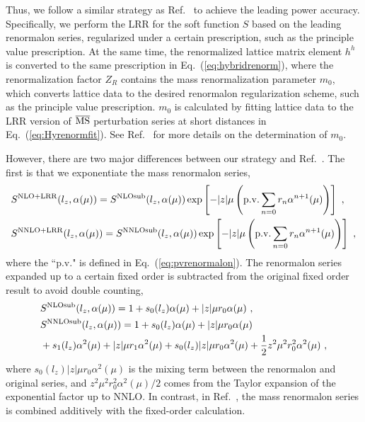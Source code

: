 \documentclass[a4paper,11pt]{article}
\begin{document}
Thus, we follow a similar strategy as Ref.~\cite{Zhang:2023bxs} to achieve the leading power accuracy. Specifically, we perform the LRR for the soft function $S$ based on the leading renormalon series, regularized under a certain prescription, such as the principle value prescription. At the same time, the renormalized lattice matrix element $h^h$ is converted to the same prescription in Eq.~(\ref{eq:hybridrenorm}), where the renormalization factor $Z_R$ contains the mass renormalization parameter $m_0$, which converts lattice data to the desired renormalon regularization scheme, such as the principle value prescription. $m_0$ is calculated by fitting lattice data to the LRR version of $\overline{\rm MS}$ perturbation series at short distances in Eq.~(\ref{eq:Hyrenormfit}). See Ref.~\cite{Zhang:2023bxs} for more details on the determination of $m_0$.

However, there are two major differences between our strategy and Ref.~\cite{Zhang:2023bxs}. The first is that we exponentiate the mass renormalon series,
\begin{align}\label{eq:SLRR}
&S^{\rm NLO+LRR}(l_z,\alpha(\mu)) = S^{\rm NLOsub}(l_z,\alpha(\mu)) \exp\left[-|z|\mu \left({\rm p.v.}\sum_{n=0} r_{n} \alpha^{n+1}(\mu)\right) \right] \ , \nonumber\\
&S^{\rm NNLO+LRR}(l_z,\alpha(\mu)) = S^{\rm NNLOsub}(l_z,\alpha(\mu))\exp\left[-|z|\mu \left({\rm p.v.}\sum_{n=0} r_{n} \alpha^{n+1}(\mu)\right) \right] \ ,
\end{align}
where the ``p.v." is defined in Eq.~(\ref{eq:pvrenormalon}). The renormalon series expanded up to a certain fixed order is subtracted from the original fixed order result to avoid double counting,
\begin{align}\label{eq:Ssub}
&S^{\rm NLOsub}(l_z,\alpha(\mu)) = 1 + s_0(l_z) \alpha(\mu) + |z|\mu r_0 \alpha(\mu) \ , \nonumber\\
&S^{\rm NNLOsub}(l_z,\alpha(\mu)) = 1 + s_0(l_z) \alpha(\mu) + |z|\mu r_0 \alpha(\mu) \nonumber\\
& + s_1(l_z) \alpha^2(\mu) + |z|\mu r_1 \alpha^2(\mu)
+ s_0(l_z) |z|\mu r_0 \alpha^2(\mu) + \frac{1}{2} z^2 \mu^2 r_0^2 \alpha^2(\mu) \ ,
\end{align}
where $s_0(l_z) |z|\mu r_0 \alpha^2(\mu)$ is the mixing term between the renormalon and original series, and $z^2 \mu^2 r_0^2 \alpha^2(\mu)/2$ comes from the Taylor expansion of the exponential factor up to NNLO. In contrast, in Ref.~\cite{Zhang:2023bxs}, the mass renormalon series is combined additively with the fixed-order calculation. 
\end{document}
